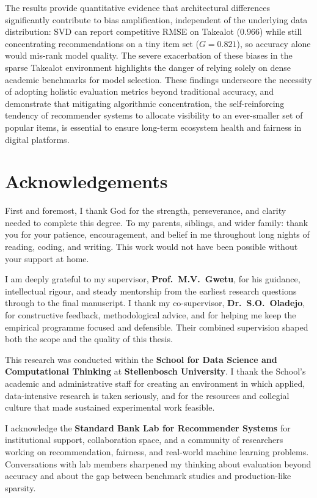 \documentclass[11pt,a4paper]{report}
\begin{document}
The results provide quantitative evidence that architectural differences significantly contribute to bias amplification, independent of the underlying data distribution: SVD can report competitive RMSE on Takealot ($0.966$) while still concentrating recommendations on a tiny item set ($G = 0.821$), so accuracy alone would mis-rank model quality. The severe exacerbation of these biases in the sparse Takealot environment highlights the danger of relying solely on dense academic benchmarks for model selection. These findings underscore the necessity of adopting holistic evaluation metrics beyond traditional accuracy, and demonstrate that mitigating algorithmic concentration, the self-reinforcing tendency of recommender systems to allocate visibility to an ever-smaller set of popular items, is essential to ensure long-term ecosystem health and fairness in digital platforms.

\chapter*{Acknowledgements}

First and foremost, I thank God for the strength, perseverance, and clarity needed to complete this degree. To my parents, siblings, and wider family: thank you for your patience, encouragement, and belief in me throughout long nights of reading, coding, and writing. This work would not have been possible without your support at home.

I am deeply grateful to my supervisor, \textbf{Prof.\ M.V.\ Gwetu}, for his guidance, intellectual rigour, and steady mentorship from the earliest research questions through to the final manuscript. I thank my co-supervisor, \textbf{Dr.\ S.O.\ Oladejo}, for constructive feedback, methodological advice, and for helping me keep the empirical programme focused and defensible. Their combined supervision shaped both the scope and the quality of this thesis.

This research was conducted within the \textbf{School for Data Science and Computational Thinking} at \textbf{Stellenbosch University}. I thank the School's academic and administrative staff for creating an environment in which applied, data-intensive research is taken seriously, and for the resources and collegial culture that made sustained experimental work feasible.

I acknowledge the \textbf{Standard Bank Lab for Recommender Systems} for institutional support, collaboration space, and a community of researchers working on recommendation, fairness, and real-world machine learning problems. Conversations with lab members sharpened my thinking about evaluation beyond accuracy and about the gap between benchmark studies and production-like sparsity.
\end{document}
